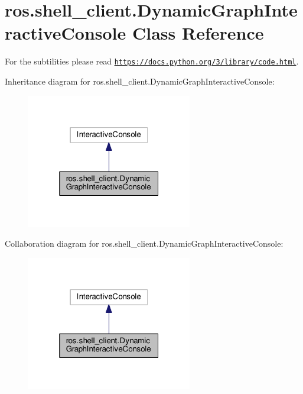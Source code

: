 \hypertarget{classros_1_1shell__client_1_1DynamicGraphInteractiveConsole}{}\section{ros.\+shell\+\_\+client.\+Dynamic\+Graph\+Interactive\+Console Class Reference}
\label{classros_1_1shell__client_1_1DynamicGraphInteractiveConsole}


For the subtilities please read \href{https://docs.python.org/3/library/code.html}{\tt https\+://docs.\+python.\+org/3/library/code.\+html}.  




Inheritance diagram for ros.\+shell\+\_\+client.\+Dynamic\+Graph\+Interactive\+Console\+:
\nopagebreak
\begin{figure}[H]
\begin{center}
\leavevmode
\includegraphics[width=205pt]{classros_1_1shell__client_1_1DynamicGraphInteractiveConsole__inherit__graph}
\end{center}
\end{figure}


Collaboration diagram for ros.\+shell\+\_\+client.\+Dynamic\+Graph\+Interactive\+Console\+:
\nopagebreak
\begin{figure}[H]
\begin{center}
\leavevmode
\includegraphics[width=205pt]{classros_1_1shell__client_1_1DynamicGraphInteractiveConsole__coll__graph}
\end{center}
\end{figure}
